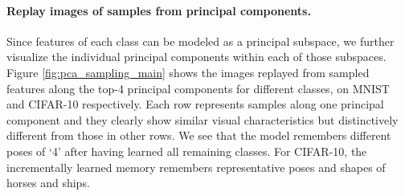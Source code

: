 \documentclass[../../book-main.tex]{subfiles}
\begin{document}


\paragraph{Replay images of samples from principal components.}
Since features of each class can be modeled as a principal subspace, we further visualize the individual principal components within each of those subspaces. Figure \ref{fig:pca_sampling_main} shows the images replayed from sampled features along the top-4 principal components for different classes, on MNIST and CIFAR-10 respectively. Each row represents samples along one principal component and they clearly show similar visual characteristics but distinctively different from those in other rows. We see that the model remembers different poses of `4' after having learned all remaining classes. For CIFAR-10, the incrementally learned memory remembers representative poses and shapes of horses and ships. 
\end{document}
